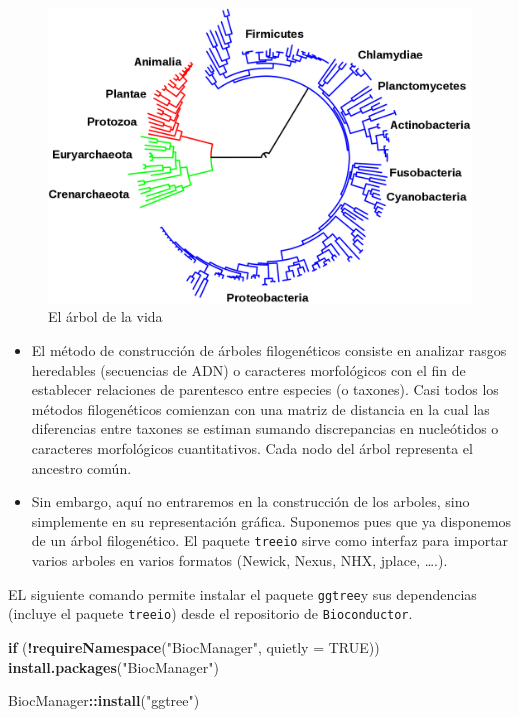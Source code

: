 \documentclass[]{article}
\newenvironment{Shaded}{\begin{snugshade}}{\end{snugshade}}
\newcommand{\ControlFlowTok}[1]{\textcolor[rgb]{0.13,0.29,0.53}{\textbf{#1}}}
\newcommand{\DataTypeTok}[1]{\textcolor[rgb]{0.13,0.29,0.53}{#1}}
\newcommand{\KeywordTok}[1]{\textcolor[rgb]{0.13,0.29,0.53}{\textbf{#1}}}
\newcommand{\NormalTok}[1]{#1}
\newcommand{\OperatorTok}[1]{\textcolor[rgb]{0.81,0.36,0.00}{\textbf{#1}}}
\newcommand{\OtherTok}[1]{\textcolor[rgb]{0.56,0.35,0.01}{#1}}
\newcommand{\StringTok}[1]{\textcolor[rgb]{0.31,0.60,0.02}{#1}}
\numberwithin{ejcnt}{section}
\begin{document}
\begin{figure}
\centering
\includegraphics{imagenes/Tree_of_life_int.svg.png}
\caption{El árbol de la vida}
\end{figure}

\begin{itemize}
\item
  El método de construcción de árboles filogenéticos consiste en analizar rasgos heredables (secuencias de ADN) o caracteres morfológicos con el fin de establecer relaciones de parentesco entre especies (o taxones). Casi todos los métodos filogenéticos comienzan con una matriz de distancia en la cual las diferencias entre taxones se estiman sumando discrepancias en nucleótidos o caracteres morfológicos cuantitativos. Cada nodo del árbol representa el ancestro común.
\item
  Sin embargo, aquí no entraremos en la construcción de los arboles, sino simplemente en su representación gráfica. Suponemos pues que ya disponemos de un árbol filogenético. El paquete \texttt{treeio} sirve como interfaz para importar varios arboles en varios formatos (Newick, Nexus, NHX, jplace, \ldots.).
\end{itemize}

EL siguiente comando permite instalar el paquete \texttt{ggtree}y sus dependencias (incluye el paquete \texttt{treeio}) desde el repositorio de \texttt{Bioconductor}.

\begin{Shaded}
\begin{Highlighting}[]
\ControlFlowTok{if}\NormalTok{ (}\OperatorTok{!}\KeywordTok{requireNamespace}\NormalTok{(}\StringTok{"BiocManager"}\NormalTok{, }\DataTypeTok{quietly =} \OtherTok{TRUE}\NormalTok{))}
    \KeywordTok{install.packages}\NormalTok{(}\StringTok{"BiocManager"}\NormalTok{)}

\NormalTok{BiocManager}\OperatorTok{::}\KeywordTok{install}\NormalTok{(}\StringTok{"ggtree"}\NormalTok{)}
\end{Highlighting}
\end{Shaded}
\end{document}

